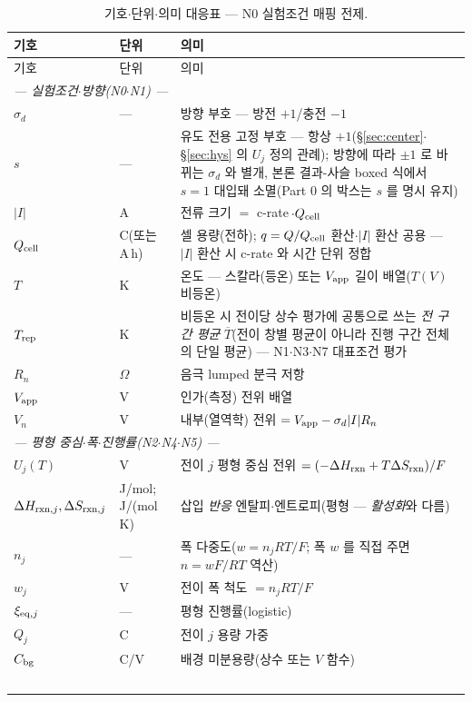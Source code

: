 \begin{longtable}{p{} p{} p{}}
\caption{기호$\cdot$단위$\cdot$의미 대응표 --- N0 실험조건 매핑 전제.}\label{tab:notation}\\
\toprule 기호 & 단위 & 의미 \\ \midrule \endfirsthead
\toprule 기호 & 단위 & 의미 \\ \midrule \endhead
\multicolumn{3}{l}{\emph{— 실험조건$\cdot$방향(N0$\cdot$N1) —}}\\
$\sigma_d$ & --- & 방향 부호 — 방전 $+1$/충전 $-1$ \\
$s$ & --- & 유도 전용 고정 부호 — 항상 $+1$(\S\ref{sec:center}$\cdot$\S\ref{sec:hys} 의 $U_j$ 정의 관례); 방향에 따라 $\pm1$ 로 바뀌는 $\sigma_d$ 와 별개, 본론 결과-사슬 boxed 식에서 $s{=}1$ 대입돼 소멸(Part 0 의 박스는 $s$ 를 명시 유지) \\
$|I|$ & A & 전류 크기 $=$ c-rate$\,\cdot Q_\cell$ \\
$Q_\cell$ & C(또는 A\,h) & 셀 용량(전하); $q=Q/Q_\cell$ 환산$\cdot$$|I|$ 환산 공용 — $|I|$ 환산 시 c-rate 와 시간 단위 정합 \\
$T$ & K & 온도 — 스칼라(등온) 또는 $V_\app$ 길이 배열($T(V)$ 비등온) \\
$T_\rep$ & K & 비등온 시 전이당 상수 평가에 공통으로 쓰는 \emph{전 구간 평균} $\overline T$(전이 창별 평균이 아니라 진행 구간 전체의 단일 평균) — N1$\cdot$N3$\cdot$N7 대표조건 평가 \\
$R_n$ & $\Omega$ & 음극 lumped 분극 저항 \\
$V_\app$ & V & 인가(측정) 전위 배열 \\
$V_n$ & V & 내부(열역학) 전위 $=V_\app-\sigma_d|I|R_n$ \\
\multicolumn{3}{l}{\emph{— 평형 중심$\cdot$폭$\cdot$진행률(N2$\cdot$N4$\cdot$N5) —}}\\
$U_j(T)$ & V & 전이 $j$ 평형 중심 전위 $=(-\Delta H_\rxn+T\Delta S_\rxn)/F$ \\
$\Delta H_{\rxn,j},\Delta S_{\rxn,j}$ & {\footnotesize J/mol;\,J/(mol\,K)} & 삽입 \emph{반응} 엔탈피$\cdot$엔트로피(평형 — \emph{활성화}와 다름) \\
$n_j$ & --- & 폭 다중도($w=n_jRT/F$; 폭 $w$ 를 직접 주면 $n=wF/RT$ 역산) \\
$w_j$ & V & 전이 폭 척도 $=n_jRT/F$ \\
$\xi_{\eq,j}$ & --- & 평형 진행률(logistic) \\
$Q_j$ & C & 전이 $j$ 용량 가중 \\
$C_\bg$ & C/V & 배경 미분용량(상수 또는 $V$ 함수) \\
$$
\end{longtable}
